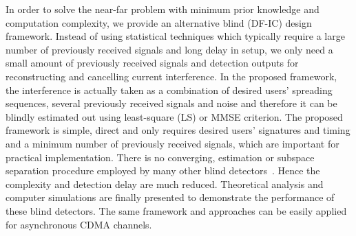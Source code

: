 \documentclass[a4paper,10pt,fleqn, twocolumn]{IEEETran}
\begin{document}
In order to solve the near-far problem with minimum prior
knowledge and computation complexity, we provide an alternative
blind (DF-IC) design framework. Instead of using statistical
techniques which typically require a large number of previously
received signals and long delay in setup, we only need a small
amount of previously received signals and detection outputs for
reconstructing and cancelling current interference. In the
proposed framework, the interference is actually taken as a
combination of desired users' spreading sequences, several
previously received signals and noise and therefore it can be
blindly estimated out using least-square (LS) or MMSE criterion.
The proposed framework is simple, direct and only requires desired
users' signatures and timing and a minimum number of previously
received signals, which are important for practical
implementation. There is no converging, estimation or subspace
separation procedure employed by many other blind
detectors~\cite{Madh94,Honi95,Wang98,Wang99}. Hence the complexity
and detection delay are much reduced. Theoretical analysis and
computer simulations are finally presented to demonstrate the
performance of these blind detectors. The same framework and
approaches can be easily applied for asynchronous CDMA channels.
\end{document}
